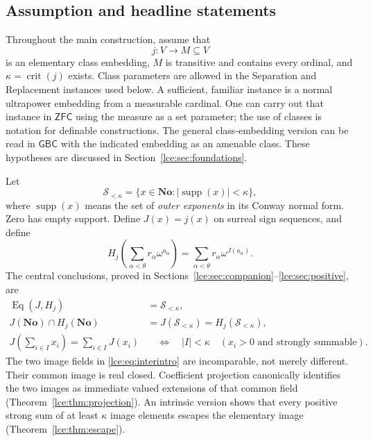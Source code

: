 \documentclass[11pt,letterpaper]{article}
\numberwithin{equation}{section}
\theoremstyle{definition}
\theoremstyle{remark}
\newcommand{\No}{\mathbf{No}}
\newcommand{\supp}{\operatorname{supp}}
\newcommand{\crit}{\operatorname{crit}}
\newcommand{\Sk}{\mathscr S_{<\kappa}}
\newcommand{\abs}[1]{\lvert#1\rvert}
\newcommand{\set}[1]{\{#1\}}
\newcommand{\ZFC}{\mathsf{ZFC}}
\newcommand{\GBC}{\mathsf{GBC}}
\begin{document}
\subsection{Assumption and headline statements}
Throughout the main construction, assume that
\begin{equation}\label{lce:eq:setting}
 j:V\longrightarrow M\subseteq V
\end{equation}
is an elementary class embedding, $M$ is transitive and contains every
ordinal, and $\kappa=\crit(j)$ exists. Class parameters are allowed in the
Separation and Replacement instances used below. A sufficient, familiar
instance is a normal ultrapower embedding from a measurable cardinal.
One can carry out that instance in $\ZFC$ using the measure as a set
parameter; the use of classes is notation for definable constructions.
The general class-embedding version can be read in $\GBC$ with the indicated
embedding as an amenable class. These hypotheses are discussed in
Section~\ref{lce:sec:foundations}.

Let
\begin{equation}\label{lce:eq:shortfield}
 \Sk=\set{x\in\No:\abs{\supp(x)}<\kappa},
\end{equation}
where $\supp(x)$ means the set of \emph{outer exponents} in its Conway normal
form. Zero has empty support. Define $J(x)=j(x)$ on surreal sign sequences,
and define
\begin{equation}\label{lce:eq:Hintro}
 H_j\left(\sum_{\alpha<\theta}r_\alpha\omega^{a_\alpha}\right)
   =\sum_{\alpha<\theta}r_\alpha\omega^{J(a_\alpha)}.
\end{equation}
The central conclusions, proved in Sections~\ref{lce:sec:companion}--\ref{lce:sec:positive},
are
\begin{align}
 \operatorname{Eq}(J,H_j)&=\Sk,\label{lce:eq:eqintro}\\
 J(\No)\cap H_j(\No)&=J(\Sk)=H_j(\Sk),\label{lce:eq:interintro}\\
 J\left(\sum_{i\in I}x_i\right)=\sum_{i\in I}J(x_i)
  &\quad\Longleftrightarrow\quad \abs I<\kappa
   \quad(x_i>0\text{ and strongly summable}).\label{lce:eq:posintro}
\end{align}
The two image fields in \eqref{lce:eq:interintro} are incomparable, not merely
different. Their common image is real closed. Coefficient projection
canonically identifies the two images as immediate valued extensions of
that common field (Theorem~\ref{lce:thm:projection}). An intrinsic version
shows that every positive strong sum of at least $\kappa$ image elements
escapes the elementary image (Theorem~\ref{lce:thm:escape}).
\end{document}
